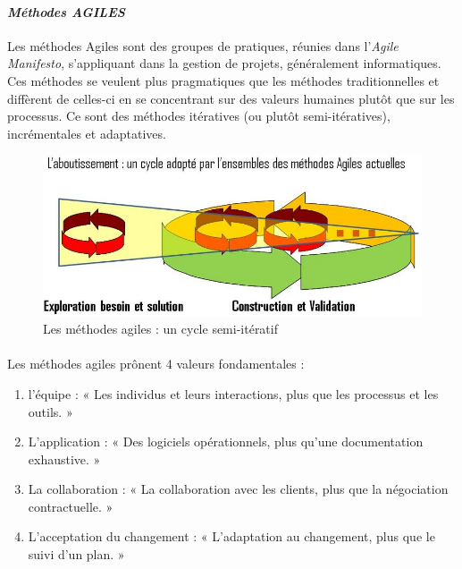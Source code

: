 	\paragraph{\emph{Méthodes AGILES}\\}
Les méthodes Agiles sont des groupes de pratiques, réunies dans l'\emph{Agile Manifesto}\cite{Agil01}, s'appliquant dans la gestion de projets, généralement informatiques. Ces méthodes se veulent plus pragmatiques que les méthodes traditionnelles et diffèrent de celles-ci en se concentrant sur des valeurs humaines plutôt que sur les processus. Ce sont des méthodes itératives (ou plutôt semi-itératives), incrémentales et adaptatives.
\begin{figure}
	\centering
	\includegraphics[scale=0.5]{images/agile.jpg}
	\caption{Les méthodes agiles : un cycle semi-itératif}
	\label{agile}
\end{figure}
 
\paragraph{}
Les méthodes agiles prônent 4 valeurs fondamentales :
	\begin{enumerate}
		\item l'équipe : « Les individus et leurs interactions, plus que les processus et les outils. »
		\item L'application : « Des logiciels opérationnels, plus qu'une documentation exhaustive. »
		\item  La collaboration : « La collaboration avec les clients, plus que la négociation contractuelle. »
		\item L'acceptation du changement : « L'adaptation au changement, plus que le suivi d'un plan. »
	\end{enumerate}

